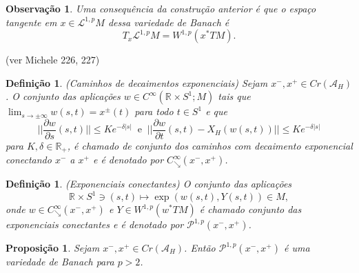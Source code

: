 \documentclass[12pt]{book}
\newtheorem{definicao}[teorema]{Definição}
\newtheorem{observacao}[teorema]{Observação}
\newtheorem{proposicao}[teorema]{Proposição}
\newcommand{\aplicaoessuavesreatacirculo}{C^{\infty}(\retacartesianocirculo; M)}
\newcommand{\caminhosdecaimentoexponencial}[2]{C^{\infty}_{\searrow}(#1, #2)}
\newcommand{\caminhosdecaimentoexponencialpadrao}{\caminhosdecaimentoexponencial{x^{-}}{x^{+}}}
\newcommand{\caminhosexponenciaisconectantes}[2]{\mathcal{P}^{1,p}(#1, #2)}
\newcommand{\caminhosexponenciaisSobolev}{\mathcal{L}^{1,p}M}
\newcommand{\caminhosexponenciaisconectantespadrao}{\caminhosexponenciaisconectantes{x^{-}}{x^{+}}}
\newcommand{\circulo}{S^{1}}
\newcommand{\derivadaparcial}[2]{\frac{\partial #1}{\partial #2}}
\newcommand{\espacosobolev}[1]{W^{1,p}(#1)}
\newcommand{\espacotangenteponto}[2]{T_{#1}#2}
\newcommand{\funcionalH}{\mathcal{A}_{H}}
\newcommand{\normagrande}[1]{\Big|\Big|#1\Big|\Big|}
\newcommand{\pontoscriticos}[1]{\textit{Cr}(#1)}
\newcommand{\pullbackfibradotangente}[2]{#1^{*}T#2}
\newcommand{\pullbackfibradotangenteM}[1]{\pullbackfibradotangente{#1}{M}}
\newcommand{\retacartesianocirculo}{\real{} \times \circulo}
\newcommand{\real}[1]{\mathbb{R}^{#1}}
\newcommand{\reta}{\real{}}
\newcommand{\aviso}[1]{{\color{violet}(#1)}}
\begin{document}
	\begin{observacao}
		Uma consequência da construção anterior é que o espaço tangente em $x\in \caminhosexponenciaisSobolev$ dessa variedade de Banach é
		$$
		\espacotangenteponto{x}{\caminhosexponenciaisSobolev} = \espacosobolev{\pullbackfibradotangenteM{x}}.
		$$
	\end{observacao}
	
	\aviso{ver Michele 226, 227}
	\begin{definicao}\label{definicao_caminhos_decaimentos_exponenciais}
		(Caminhos de decaimentos exponenciais) Sejam $x^{-}, x^{+} \in \pontoscriticos{\funcionalH}$. O conjunto das aplicações $w \in \aplicaoessuavesreatacirculo$ tais que $\lim_{s \to \pm \infty} w(s,t) = x^{\pm}(t)$ para todo  $t\in \circulo $ e que 
		$$
		\normagrande{\derivadaparcial{w}{s}(s,t)} \leq Ke^{-\delta|s|} \;\; \text{e} \;\; \normagrande{\derivadaparcial{w}{t}(s,t) -X_{H}(w(s,t))} \leq Ke^{-\delta|s|}
		$$
		para $K,\delta \in \reta_{+}$, é chamado de conjunto dos caminhos com decaimento exponencial conectando $x^{-}$ a $x^{+}$ e é denotado por $\caminhosdecaimentoexponencialpadrao$.
	\end{definicao}
	
	\begin{definicao}
		(Exponenciais conectantes) O conjunto das aplicações 
		$$
		\retacartesianocirculo \ni (s,t) \mapsto \exp(w(s,t), Y(s,t)) \in M,
		$$
		onde $w \in \caminhosdecaimentoexponencialpadrao$ e $Y\in \espacosobolev{\pullbackfibradotangenteM{w}}$ é chamado conjunto das exponenciais conectantes e é denotado por $\caminhosexponenciaisconectantespadrao$.
	\end{definicao}
	
	\begin{proposicao}\label{proposicao_variedade_banach}
		Sejam $x^{-}, x^{+} \in \pontoscriticos{\funcionalH}$. Então $\caminhosexponenciaisconectantespadrao$ é uma variedade de Banach para $p>2$.
	\end{proposicao}
	
\end{document}
